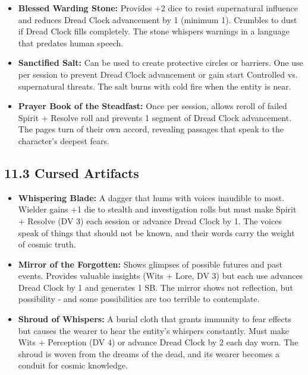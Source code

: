 \documentclass[11pt]{article}
\begin{document}
\begin{itemize}
\item \textbf{Blessed Warding Stone:} Provides +2 dice to resist supernatural influence and reduces Dread Clock advancement by 1 (minimum 1). Crumbles to dust if Dread Clock fills completely. The stone whispers warnings in a language that predates human speech.
\item \textbf{Sanctified Salt:} Can be used to create protective circles or barriers. One use per session to prevent Dread Clock advancement or gain start Controlled vs. supernatural threats. The salt burns with cold fire when the entity is near.
\item \textbf{Prayer Book of the Steadfast:} Once per session, allows reroll of failed Spirit + Resolve roll and prevents 1 segment of Dread Clock advancement. The pages turn of their own accord, revealing passages that speak to the character's deepest fears.
\end{itemize}

\clearpage

\subsection*{11.3 Cursed Artifacts}

\begin{itemize}
\item \textbf{Whispering Blade:} A dagger that hums with voices inaudible to most. Wielder gains +1 die to stealth and investigation rolls but must make Spirit + Resolve (DV 3) each session or advance Dread Clock by 1. The voices speak of things that should not be known, and their words carry the weight of cosmic truth.
\item \textbf{Mirror of the Forgotten:} Shows glimpses of possible futures and past events. Provides valuable insights (Wits + Lore, DV 3) but each use advances Dread Clock by 1 and generates 1 SB. The mirror shows not reflection, but possibility - and some possibilities are too terrible to contemplate.
\item \textbf{Shroud of Whispers:} A burial cloth that grants immunity to fear effects but causes the wearer to hear the entity's whispers constantly. Must make Wits + Perception (DV 4) or advance Dread Clock by 2 each day worn. The shroud is woven from the dreams of the dead, and its wearer becomes a conduit for cosmic knowledge.
\end{itemize}

\clearpage
\end{document}

